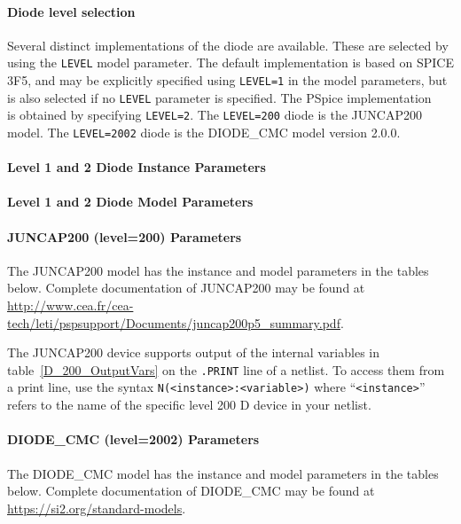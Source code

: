 \paragraph{Diode level selection}

Several distinct implementations of the diode are available.  These are
selected by using the \verb|LEVEL| model parameter.  The default
implementation is based on SPICE 3F5, and may be explicitly specified
using \verb|LEVEL=1| in the model parameters, but is also selected if no
\verb|LEVEL| parameter is specified.  The PSpice implementation
~\cite{PSpiceUG:1998} is obtained by specifying \verb|LEVEL=2|.
The \Xyce{} \verb|LEVEL=200| diode is the JUNCAP200 model.
The \Xyce{} \verb|LEVEL=2002| diode is the DIODE\_CMC model version 2.0.0.


\pagebreak

\paragraph{Level 1 and 2 Diode Instance Parameters}


\paragraph{Level 1 and 2 Diode Model Parameters}


\paragraph{JUNCAP200 (level=200) Parameters}
The JUNCAP200 model has the instance and model parameters in the
tables below.  Complete documentation of JUNCAP200 may be found at
\url{http://www.cea.fr/cea-tech/leti/pspsupport/Documents/juncap200p5_summary.pdf}.


The JUNCAP200 device supports output of the internal variables in
table~\ref{D_200_OutputVars} on the \texttt{.PRINT} line of a netlist.
To access them from a print line, use the syntax
\texttt{N(<instance>:<variable>)} where ``\texttt{<instance>}'' refers to the
name of the specific level 200 D device in your netlist.





\paragraph{DIODE\_CMC (level=2002) Parameters}
The DIODE\_CMC model has the instance and model parameters in the
tables below.  Complete documentation of DIODE\_CMC may be found at
\url{https://si2.org/standard-models}.


